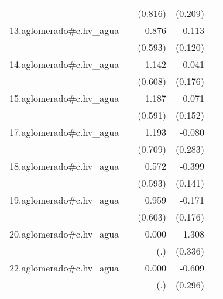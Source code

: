 {\begin{longtable}{l*{4}{D{.}{.}{-1}}}
            &                     &     (0.816)         &     (0.209)         &                     \\
\addlinespace
13.aglomerado#c.hv\_agua&                     &       0.876         &       0.113         &                     \\
            &                     &     (0.593)         &     (0.120)         &                     \\
\addlinespace
14.aglomerado#c.hv\_agua&                     &       1.142         &       0.041         &                     \\
            &                     &     (0.608)         &     (0.176)         &                     \\
\addlinespace
15.aglomerado#c.hv\_agua&                     &       1.187\sym{*}  &       0.071         &                     \\
            &                     &     (0.591)         &     (0.152)         &                     \\
\addlinespace
17.aglomerado#c.hv\_agua&                     &       1.193         &      -0.080         &                     \\
            &                     &     (0.709)         &     (0.283)         &                     \\
\addlinespace
18.aglomerado#c.hv\_agua&                     &       0.572         &      -0.399\sym{**} &                     \\
            &                     &     (0.593)         &     (0.141)         &                     \\
\addlinespace
19.aglomerado#c.hv\_agua&                     &       0.959         &      -0.171         &                     \\
            &                     &     (0.603)         &     (0.176)         &                     \\
\addlinespace
20.aglomerado#c.hv\_agua&                     &       0.000         &       1.308\sym{***}&                     \\
            &                     &         (.)         &     (0.336)         &                     \\
\addlinespace
22.aglomerado#c.hv\_agua&                     &       0.000         &      -0.609\sym{*}  &                     \\
            &                     &         (.)         &     (0.296)         &                     \\

\end{longtable}}
